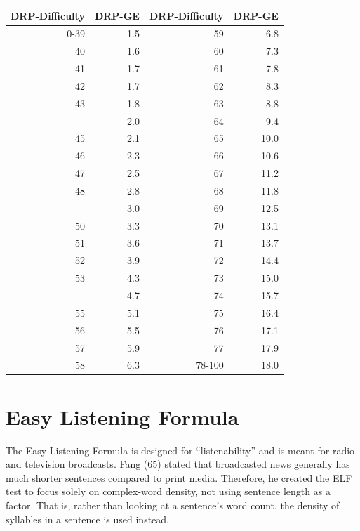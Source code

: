 \documentclass[
]{book}
\theoremstyle{definition}
\theoremstyle{definition}
\theoremstyle{definition}
\theoremstyle{definition}
\theoremstyle{remark}
\begin{document}
\begin{table}
\centering
\begin{tabular}[t]{r>{}r|rr}
\toprule
DRP-Difficulty & DRP-GE & DRP-Difficulty  & DRP-GE \\
\midrule
0-39 & 1.5 & 59 & 6.8\\
40 & 1.6 & 60 & 7.3\\
41 & 1.7 & 61 & 7.8\\
42 & 1.7 & 62 & 8.3\\
43 & 1.8 & 63 & 8.8\\
\addlinespace
44 & 2.0 & 64 & 9.4\\
45 & 2.1 & 65 & 10.0\\
46 & 2.3 & 66 & 10.6\\
47 & 2.5 & 67 & 11.2\\
48 & 2.8 & 68 & 11.8\\
\addlinespace
49 & 3.0 & 69 & 12.5\\
50 & 3.3 & 70 & 13.1\\
51 & 3.6 & 71 & 13.7\\
52 & 3.9 & 72 & 14.4\\
53 & 4.3 & 73 & 15.0\\
\addlinespace
54 & 4.7 & 74 & 15.7\\
55 & 5.1 & 75 & 16.4\\
56 & 5.5 & 76 & 17.1\\
57 & 5.9 & 77 & 17.9\\
58 & 6.3 & 78-100 & 18.0\\
\bottomrule
\end{tabular}
\end{table}


\newpage

\hypertarget{easy-listening-formula}{%
\section{\texorpdfstring{Easy Listening Formula}{Easy Listening Formula}}\label{easy-listening-formula}}

The Easy Listening Formula is designed for ``listenability'' and is meant for radio and television broadcasts. Fang (65) stated that broadcasted news generally has much shorter sentences compared to print media. Therefore, he created the ELF test to focus solely on complex-word density, not using sentence length as a factor. That is, rather than looking at a sentence's word count, the density of syllables in a sentence is used instead.
\end{document}
